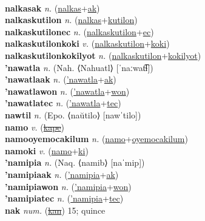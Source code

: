  \label{nalkas} \\
\textbf{nalkasak} \textit{n.} (\hyperref[nalkas]{nalkas}+\hyperref[ak]{ak})
 \label{nalkasak} \\
\textbf{nalkaskutilon} \textit{n.} (\hyperref[nalkas]{nalkas}+\hyperref[kutilon]{kutilon})
 \label{nalkaskutilon} \\
\textbf{nalkaskutilonec} \textit{n.} (\hyperref[nalkaskutilon]{nalkaskutilon}+\hyperref[ec]{ec})
 \label{nalkaskutilonec} \\
\textbf{nalkaskutilonkoki} \textit{v.} (\hyperref[nalkaskutilon]{nalkaskutilon}+\hyperref[koki]{koki})
 \label{nalkaskutilonkoki} \\
\textbf{nalkaskutilonkokilyot} \textit{n.} (\hyperref[nalkaskutilon]{nalkaskutilon}+\hyperref[kokilyot]{kokilyot})
 \label{nalkaskutilonkokilyot} \\
\textbf{'nawatla} \textit{n.} (Nah. ⟨Nahuatl⟩ [ˈnaːwat͡ɬ])
 \label{'nawatla} \\
\textbf{'nawatlaak} \textit{n.} (\hyperref['nawatla]{'nawatla}+\hyperref[ak]{ak})
 \label{'nawatlaak} \\
\textbf{'nawatlawon} \textit{n.} (\hyperref['nawatla]{'nawatla}+\hyperref[won]{won})
 \label{'nawatlawon} \\
\textbf{'nawatlatec} \textit{n.} (\hyperref['nawatla]{'nawatla}+\hyperref[tec]{tec})
 \label{'nawatlatec} \\
\textbf{nawtil} \textit{n.} (Epo. ⟨naŭtilo⟩ [nawˈtilo])
 \label{nawtil} \\
\textbf{namo} \textit{v.} (\hyperref[kape]{\sout{kape}})
 \label{namo} \\
\textbf{namooyemocakilum} \textit{n.} (\hyperref[namo]{namo}+\hyperref[oyemocakilum]{oyemocakilum})
 \label{namooyemocakilum} \\
\textbf{namoki} \textit{v.} (\hyperref[namo]{namo}+\hyperref[ki]{ki})
 \label{namoki} \\
\textbf{'namipia} \textit{n.} (Naq. ⟨namib⟩ [naˈmip])
 \label{'namipia} \\
\textbf{'namipiaak} \textit{n.} (\hyperref['namipia]{'namipia}+\hyperref[ak]{ak})
 \label{'namipiaak} \\
\textbf{'namipiawon} \textit{n.} (\hyperref['namipia]{'namipia}+\hyperref[won]{won})
 \label{'namipiawon} \\
\textbf{'namipiatec} \textit{n.} (\hyperref['namipia]{'namipia}+\hyperref[tec]{tec})
 \label{'namipiatec} \\
\textbf{nak} \textit{num.} (\hyperref[kan]{\sout{kan}})
15; quince \label{nak} \\
